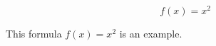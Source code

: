 \documentclass{article}
\begin{document}
\begin{equation*}
f(x) = x^2
\end{equation*}

This formula $f(x) = x^2 $ is an example.
\end{document}

